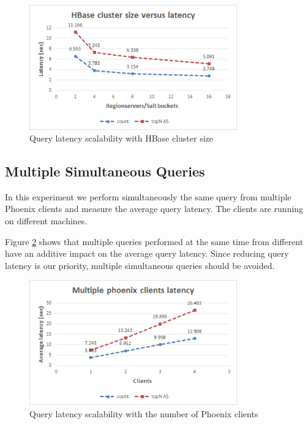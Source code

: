 \begin{figure}[H]
\centering
\includegraphics[width=0.8\textwidth]{figures/benchmarks_hbase_scalability_latency}
\caption{Query latency scalability with HBase cluster size}
\label{figure:benchmarks_hbase_scalability_latency}
\end{figure}

\subsection{Multiple Simultaneous Queries}

In this experiment we perform simultaneously the same query from multiple Phoenix clients and measure the average query latency. The clients are running on different machines. 

Figure \ref{figure:benchmarks_hbase_phoenix_clients} shows that multiple queries performed at the same time from different have an additive impact on the average query latency. Since reducing query latency is our priority, multiple simultaneous queries should be avoided.

\begin{figure}[H]
\centering
\includegraphics[width=0.8\textwidth]{figures/benchmarks_hbase_phoenix_clients}
\caption{Query latency scalability with the number of Phoenix clients}
\label{figure:benchmarks_hbase_phoenix_clients}
\end{figure}


\cleardoublepage
